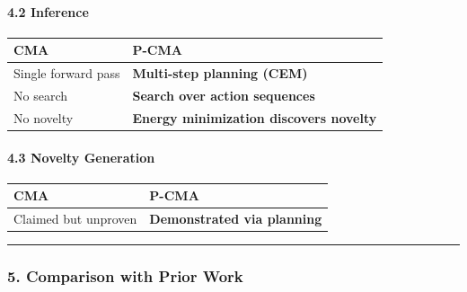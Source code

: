 \documentclass[
  11pt,
  a4paper,
]{article}
\begin{document}
\paragraph{4.2 Inference}\label{inference}

\begin{longtable}[]{@{}ll@{}}
\toprule\noalign{}
CMA & \textbf{P-CMA} \\
\midrule\noalign{}
\endhead
\bottomrule\noalign{}
\endlastfoot
Single forward pass & \textbf{Multi-step planning (CEM)} \\
No search & \textbf{Search over action sequences} \\
No novelty & \textbf{Energy minimization discovers novelty} \\
\end{longtable}

\paragraph{4.3 Novelty Generation}\label{novelty-generation}

\begin{longtable}[]{@{}ll@{}}
\toprule\noalign{}
CMA & \textbf{P-CMA} \\
\midrule\noalign{}
\endhead
\bottomrule\noalign{}
\endlastfoot
Claimed but unproven & \textbf{Demonstrated via planning} \\
\end{longtable}

\begin{center}\rule{0.5\linewidth}{0.5pt}\end{center}

\subsubsection{5. Comparison with Prior
Work}\label{comparison-with-prior-work}
\end{document}
